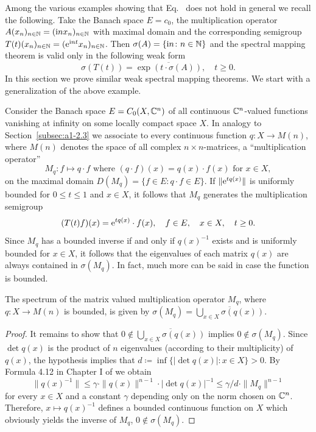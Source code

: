 Among the various examples showing that Eq.~ does not hold in general we recall the following.
Take the Banach space $E = c_{0}$, the multiplication operator $A(x_{n})_{n\in\mathbb{N}} = (\mathrm{i} n x_{n})_{n\in\mathbb{N}}$ with maximal domain and the corresponding semigroup $T(t)(x_{n})_{n \in \mathbb{N}} = 
(\mathrm{e}^{\mathrm{i} nt}x_{n})_{n \in \mathbb{N}}$.
Then $\sigma(A) = \{\mathrm{i} n \colon n \in \mathbb{N}\}$ and the spectral mapping theorem is valid only in the following weak form
\begin{equation}\label{eq:a3-7.2}
	\sigma(T(t)) = \overline{\exp(t\cdot\sigma(A))}, \quad t \geq 0 .
\end{equation}
In this section we prove similar weak spectral mapping theorems.
We start with a generalization of the above example.

Consider the Banach space $E = C_{0}(X,\mathbb{C}^{n})$ of all continuous $\mathbb{C}^{n}$-valued functions vanishing at infinity on some locally compact space $X$.
In analogy to Section~\ref{subsec:a1-2.3} we associate to every continuous function $q \colon X \to M(n)$, where $M(n)$ denotes the space of all complex $n\times n$-matrices, a \enquote{multiplication operator} 
\[
M_{q} \colon f \mapsto q\cdot f \text{ where } (q\cdot f)(x) = q(x)\cdot f(x) \text{ for } x \in X , 
\]
on the maximal domain $D(M_{q}) = \{f \in E \colon q\cdot f \in E\}$.
If\/ $\|\mathrm{e}^{tq(x)}\|$ is uniformly bounded for $0 \leq t \leq 1$ and $x \in X$, it follows that $M_{q}$ generates the multiplication semigroup
\[
	(T(t)f)(x) = \eu^{tq(x)}\cdot f(x), \quad f \in E, \quad x \in X, \quad t \geq 0 .
\]
Since $M_{q}$ has a bounded inverse if and only if\/ $q(x)^{-1}$ exists and is uniformly bounded for $x \in X$, it follows that the eigenvalues of each matrix $q(x)$ are always contained in $\sigma(M_{q})$.
In fact, much more can be said in case the function is bounded.
\begin{lemma}\label{lem:a3-7.1}
The spectrum of the matrix valued multiplication operator $M_{q}$, where $q \colon X \to M(n)$ is bounded, is given by $\sigma(M_{q}) = \overline{\bigcup_{x\in X} \sigma(q(x))}$. 
\end{lemma}
\begin{proof}
It remains to show that $0 \notin \overline{\bigcup_{x\in X} \sigma(q(x))}$ implies $0 \notin \sigma(M_{q})$.
Since $\det q(x)$ is the product of\/ $n$ eigenvalues (according to their multiplicity) of\/ $q(x)$, the hypothesis implies that $d \coloneq \inf\{|\det q(x)| \colon x \in X\} > 0$.
By Formula 4.12 in Chapter I of \textcite{kato:1976} we obtain
\[
\|q(x)^{-1}\| \leq \gamma \cdot \|q(x)\|^{n-1} \cdot |\det q(x)|^{-1} \leq \gamma/d \cdot \|M_{q}\|^{n-1}
\]
for every $x \in X$ and a constant $\gamma$ depending only on the norm chosen on $\mathbb{C}^{n}$.
Therefore, $x \mapsto q(x)^{-1}$ defines a bounded continuous function on $X$ which obviously yields the inverse of\/ $M_{q}$, \ie $0 \notin \sigma(M_{q})$.
\end{proof}
